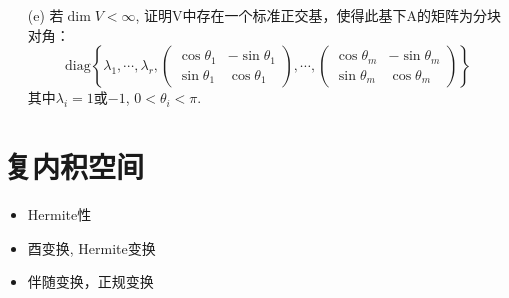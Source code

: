 \begin{itemize}
\begin{itemize}
        \item [(e)] 若$\dim V < \infty$, 证明V中存在一个标准正交基，使得此基下A的矩阵为分块对角：
        \begin{equation}
        \nonumber
        \mathrm{diag}
        \left\{
            \lambda_1, \cdots, \lambda_r,
            \begin{pmatrix}
            \cos \theta_1& -\sin \theta_1\\
            \sin \theta_1&  \cos \theta_1
            \end{pmatrix},
            \cdots,
            \begin{pmatrix}
            \cos \theta_m& -\sin \theta_m\\
            \sin \theta_m&  \cos \theta_m
            \end{pmatrix}
        \right\}
        \end{equation}
        其中$\lambda_i = 1$或$-1$, $0 < \theta_i < \pi$.
        \vspace{4cm}
        
    \end{itemize}
\end{itemize}

\section{复内积空间}
\begin{itemize}
    \item Hermite性
    \item 酉变换, Hermite变换
    \item 伴随变换，正规变换
\end{itemize}

